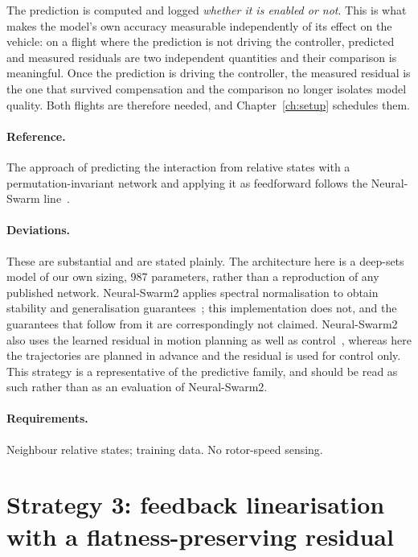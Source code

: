 The prediction is computed and logged \emph{whether it is enabled or not}. This is what makes the
model's own accuracy measurable independently of its effect on the vehicle: on a flight where the
prediction is not driving the controller, predicted and measured residuals are two independent
quantities and their comparison is meaningful. Once the prediction is driving the controller, the
measured residual is the one that survived compensation and the comparison no longer isolates model
quality. Both flights are therefore needed, and Chapter~\ref{ch:setup} schedules them.

\paragraph{Reference.} The approach of predicting the interaction from relative states with a
permutation-invariant network and applying it as feedforward follows the Neural-Swarm
line~\cite{shi2020neuralswarm,shi2022neuralswarm2}.

\paragraph{Deviations.} These are substantial and are stated plainly. The architecture here is a
deep-sets model of our own sizing, \num{987} parameters, rather than a reproduction of any
published network. Neural-Swarm2 applies spectral normalisation to obtain stability
and generalisation guarantees~\cite{shi2022neuralswarm2}; this implementation does not, and the
guarantees that follow from it are correspondingly not claimed. Neural-Swarm2 also uses the learned
residual in motion planning as well as control~\cite{shi2022neuralswarm2}, whereas here the
trajectories are planned in advance and the residual is used for control only. This strategy is a
representative of the predictive family, and should be read as such rather than as an evaluation of
Neural-Swarm2.

\paragraph{Requirements.} Neighbour relative states; training data. No rotor-speed sensing.

\section{Strategy 3: feedback linearisation with a flatness-preserving residual}
\label{sec:ctrl-s3}

